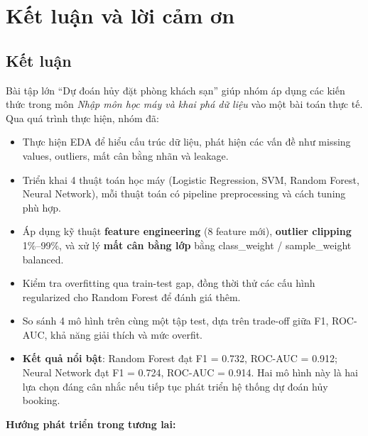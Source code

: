 \documentclass[12pt, a4paper]{article}
\begin{document}
\newpage
\section{Kết luận và lời cảm ơn}

\subsection*{Kết luận}

Bài tập lớn ``Dự đoán hủy đặt phòng khách sạn'' giúp nhóm áp dụng các kiến thức trong môn \emph{Nhập môn học máy và khai phá dữ liệu} vào một bài toán thực tế. Qua quá trình thực hiện, nhóm đã:

\begin{itemize}
    \item Thực hiện EDA để hiểu cấu trúc dữ liệu, phát hiện các vấn đề như missing values, outliers, mất cân bằng nhãn và leakage.

    \item Triển khai 4 thuật toán học máy (Logistic Regression, SVM, Random Forest, Neural Network), mỗi thuật toán có pipeline preprocessing và cách tuning phù hợp.

    \item Áp dụng kỹ thuật \textbf{feature engineering} (8 feature mới), \textbf{outlier clipping} 1\%--99\%, và xử lý \textbf{mất cân bằng lớp} bằng class\_weight / sample\_weight balanced.

    \item Kiểm tra overfitting qua train-test gap, đồng thời thử các cấu hình regularized cho Random Forest để đánh giá thêm.

    \item So sánh 4 mô hình trên cùng một tập test, dựa trên trade-off giữa F1, ROC-AUC, khả năng giải thích và mức overfit.

    \item \textbf{Kết quả nổi bật}: Random Forest đạt F1 = 0.732, ROC-AUC = 0.912; Neural Network đạt F1 = 0.724, ROC-AUC = 0.914. Hai mô hình này là hai lựa chọn đáng cân nhắc nếu tiếp tục phát triển hệ thống dự đoán hủy booking.
\end{itemize}

\textbf{Hướng phát triển trong tương lai:}
\end{document}
